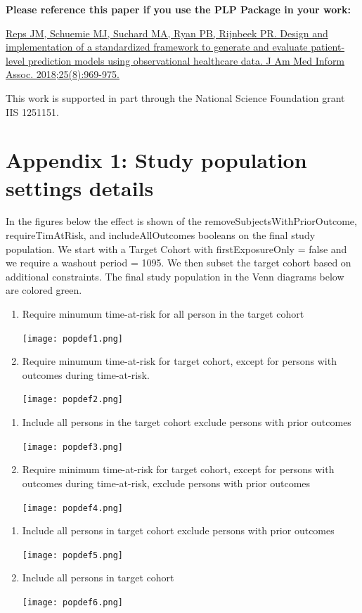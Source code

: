 \documentclass[]{article}
\begin{document}
\textbf{Please reference this paper if you use the PLP Package in your
work:}

\href{http://dx.doi.org/10.1093/jamia/ocy032}{Reps JM, Schuemie MJ,
Suchard MA, Ryan PB, Rijnbeek PR. Design and implementation of a
standardized framework to generate and evaluate patient-level prediction
models using observational healthcare data. J Am Med Inform Assoc.
2018;25(8):969-975.}

This work is supported in part through the National Science Foundation
grant IIS 1251151.

\newpage

\section{Appendix 1: Study population settings
details}\label{appendix-1-study-population-settings-details}

In the figures below the effect is shown of the
removeSubjectsWithPriorOutcome, requireTimAtRisk, and includeAllOutcomes
booleans on the final study population. We start with a Target Cohort
with firstExposureOnly = false and we require a washout period = 1095.
We then subset the target cohort based on additional constraints. The
final study population in the Venn diagrams below are colored green.

\begin{enumerate}
\def\labelenumi{\arabic{enumi})}
\item
  Require minumum time-at-risk for all person in the target cohort

  \texttt{[image: popdef1.png]}
\item
  Require minumum time-at-risk for target cohort, except for persons
  with outcomes during time-at-risk.

  \texttt{[image: popdef2.png]}
\end{enumerate}

\newpage

\begin{enumerate}
\def\labelenumi{\arabic{enumi})}
\setcounter{enumi}{2}
\item
  Include all persons in the target cohort exclude persons with prior
  outcomes

  \texttt{[image: popdef3.png]}
\item
  Require minimum time-at-risk for target cohort, except for persons
  with outcomes during time-at-risk, exclude persons with prior outcomes

  \texttt{[image: popdef4.png]}
\end{enumerate}

\newpage

\begin{enumerate}
\def\labelenumi{\arabic{enumi})}
\setcounter{enumi}{4}
\item
  Include all persons in target cohort exclude persons with prior
  outcomes

  \texttt{[image: popdef5.png]}
\item
  Include all persons in target cohort

  \texttt{[image: popdef6.png]}
\end{enumerate}
\end{document}
